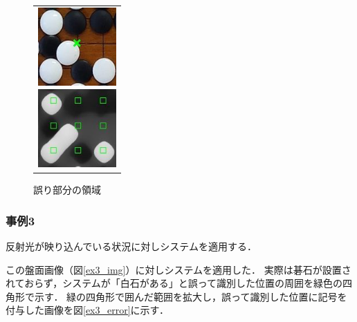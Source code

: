 \documentclass[openright]{nitocs}
\numberwithin{equation}{section}
\begin{document}
                \begin{figure}[tb] %
                    \begin{center}
                      \begin{tabular}{c}
                        \begin{minipage}{0.5\hsize}
                          \begin{center}
                            \includegraphics[clip,width=30mm]{DSC_0099/resultCompare_trim.jpg}
                        \caption{図\ref{ex2_img}の誤り部分}
                        \label{ex2_error}
                          \end{center}
                        \end{minipage}
                        \begin{minipage}{0.5\hsize}
                          \begin{center}
                            \includegraphics[clip,width=30mm]{DSC_0099/boardWithAreaImg_trim.jpg}
                        \caption{誤り部分の領域}
                        \label{ex2_error_area}
                          \end{center}
                        \end{minipage}
                      \end{tabular}
                    \end{center}
                \end{figure}
    
            \subsubsection{事例3} %
                反射光が映り込んでいる状況に対しシステムを適用する．

                この盤面画像（図\ref{ex3_img}）に対しシステムを適用した．
                実際は碁石が設置されておらず，システムが「白石がある」と誤って識別した位置の周囲を緑色の四角形で示す．
                緑の四角形で囲んだ範囲を拡大し，誤って識別した位置に記号を付与した画像を図\ref{ex3_error}に示す．
\end{document}

